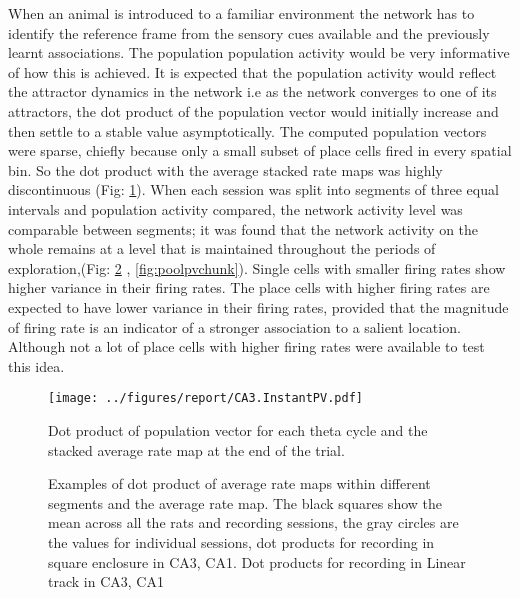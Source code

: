 When an animal is introduced to a familiar environment the network has to identify the reference frame from the sensory cues available and the previously learnt associations. The population population activity would be very informative of how this is achieved. It is expected that the population activity would reflect the attractor dynamics in the network i.e as the network converges to one of its attractors, the dot product of the population vector would initially increase and then settle to a stable value asymptotically. The computed population vectors were sparse, chiefly because only a small subset of place cells fired in every spatial bin. So the dot product with the average stacked rate maps was highly discontinuous (Fig: \ref{fig:tpv}).
When each session was split into segments of three equal intervals and population activity compared, the network activity level was comparable between segments; it was found that the network activity on the whole remains at a level that is maintained throughout the periods of exploration,(Fig: \ref{fig:pvchunks} , \ref{fig:poolpvchunk}). Single cells with smaller firing rates show higher variance in their firing rates. The place cells with higher firing rates are expected to have lower variance in their firing rates, provided that the magnitude of firing rate is an indicator of a stronger association to a salient location. Although not a lot of place cells with higher firing rates were available to test this idea.\\
\begin{figure}[htb!]
\centering
\texttt{[image: ../figures/report/CA3.InstantPV.pdf]}
\caption[Population Vector, fine time scale]{Dot product of population vector for each theta cycle and the stacked average rate map at the end of the trial.}
\label{fig:tpv}
\end{figure}

\begin{figure}[htb!]
\centering
{}
\caption[Population Vector time course]{Examples of dot product of average rate maps within different segments and the average rate map. The black squares show the mean across all the rats and recording sessions, the gray circles are the values for individual sessions, dot products for recording in square enclosure in  CA3,  CA1. Dot products for recording in Linear track in  CA3,  CA1}
\label{fig:pvchunks}
\end{figure}

